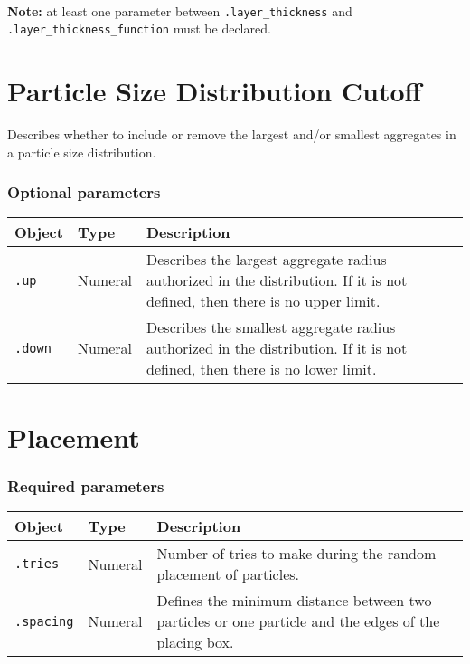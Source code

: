 \documentclass[10pt]{article}
\begin{document}
\paragraph{} \textbf{Note:} at least one parameter between \verb+.layer_thickness+  and \verb+.layer_thickness_function+ must be declared.

\section{Particle Size Distribution Cutoff}

Describes whether to include or remove the largest and/or smallest aggregates in a particle size distribution.

\subsubsection*{Optional parameters}

\begin{tabularx}{\textwidth}{llX}
\hline 
Object & Type & Description \\ 
\hline 
\verb+.up+ & Numeral & Describes the largest aggregate radius authorized in the distribution. If it is not defined, then there is no upper limit.\\
\verb+.down+ & Numeral & Describes the smallest aggregate radius authorized in the distribution. If it is not defined, then there is no lower limit.\\
\hline 
\end{tabularx}

\section{Placement}

\subsubsection*{Required parameters}

\begin{tabularx}{\textwidth}{llX}
\hline 
Object & Type & Description \\ 
\hline 
\verb+.tries+ & Numeral & Number of tries to make during the random placement of particles. \\ 
\verb+.spacing+ & Numeral & Defines the minimum distance between two particles or one particle and the edges of the placing box. \\ 
\hline 
\end{tabularx}
\end{document}
